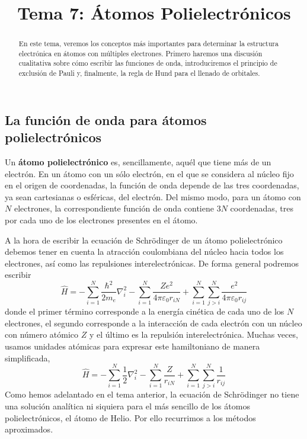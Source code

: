 \documentclass{tufte-handout}
\title[Química Física II: Tema 7 - Átomos Polielectrónicos ]{
Tema 7: Átomos Polielectrónicos}
\date{}  %
\begin{document}
\maketitle%

\begin{abstract}
\noindent 
En este tema, veremos los conceptos más importantes para determinar 
la estructura electrónica en átomos con múltiples electrones. 
Primero haremos una discusión cualitativa sobre cómo escribir
las funciones de onda, introduciremos el
principio de  exclusión de Pauli y, finalmente, la regla de Hund para
el llenado de orbitales.
\end{abstract}


\subsection{La función de onda para átomos polielectrónicos}
Un \textbf{átomo polielectrónico} es, sencillamente, aquél que
tiene más de un electrón. En un átomo con un sólo electrón, en 
el que se considera al núcleo fijo en el origen de coordenadas, 
la función de onda depende de las tres coordenadas, ya
sean cartesianas o esféricas, del electrón. Del mismo modo, para
un átomo con $N$ electrones, la correspondiente función de onda
contiene $3N$ coordenadas, tres por cada uno 
de los electrones presentes en el átomo. 

A la hora de escribir la ecuación de Schrödinger de un átomo
polielectrónico debemos tener en cuenta la atracción coulombiana
del núcleo hacia todos los electrones, así como las repulsiones
interelectrónicas. De forma general podremos escribir
\begin{equation}
    \hat{H}=  
    -\sum_{i=1}^N\frac{\hbar^2}{2m_e}\nabla_i^2  
    -\sum_{i=1}^N\frac{Ze^2}{4\pi \varepsilon_0r_{iN}} 
    +\sum_{i=1}^N\sum_{j>i}^N\frac{e^2}{4\pi \varepsilon_0r_{ij}}
\end{equation}
donde el primer término corresponde a la energía cinética 
de cada uno de los $N$ electrones, el segundo corresponde
a la interacción de cada electrón con un núcleo con número
atómico $Z$ y el último es la repulsión interelectrónica. 
Muchas veces, usamos unidades atómicas para expresar este 
hamiltoniano de manera simplificada,
\begin{equation}
    \hat{H}=  
    -\sum_{i=1}^N\frac{1}{2}\nabla_i^2  
    -\sum_{i=1}^N\frac{Z}{r_{iN}} 
    +\sum_{i=1}^N\sum_{j>i}^N\frac{1}{r_{ij}}
    \label{eq:hamiltonian_poly}
\end{equation}
Como hemos adelantado en el tema anterior, la ecuación de
Schrödinger no tiene una solución analítica ni siquiera 
para el más sencillo de los átomos polielectrónicos, el 
átomo de Helio. Por ello recurrimos a los métodos aproximados.
\end{document}
